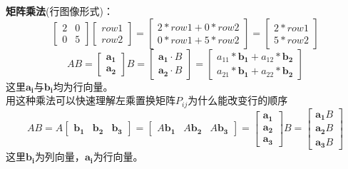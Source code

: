     \textbf{矩阵乘法}(行图像形式)：
    $$
    \begin{bmatrix}
        2 & 0 \\
        0 & 5
    \end{bmatrix}
    \begin{bmatrix}
        row1 \\
        row2
    \end{bmatrix}
    = 
    \begin{bmatrix}
        2*row1 + 0*row2 \\
        0*row1 + 5*row2
    \end{bmatrix}
    =
    \begin{bmatrix}
        2*row1 \\
        5*row2
    \end{bmatrix}
    $$
    $$
    AB =
    \begin{bmatrix}
       \bm{a_1} \\ \bm{a_2} 
    \end{bmatrix}
    B = 
    \begin{bmatrix}
        \bm{a_1} \cdot B \\ \bm{a_2} \cdot B
    \end{bmatrix}
    =
    \begin{bmatrix}
        a_{11} * \bm{b_1} + a_{12} * \bm{b_2} \\ a_{21} * \bm{b_1} + a_{22} * \bm{b_2}
    \end{bmatrix}
    $$
    这里$\bm{a_i}$与$\bm{b_i}$均为行向量。\\
    用这种乘法可以快速理解左乘置换矩阵$P_{ij}$为什么能改变行的顺序\\
    $$
    AB=A
    \begin{bmatrix}
        \bm{b_1} & \bm{b_2} & \bm{b_3}
    \end{bmatrix}
    =
    \begin{bmatrix}
        A\bm{b_1} & A\bm{b_2} & A\bm{b_3}
    \end{bmatrix}
    =
    \begin{bmatrix}
        \bm{a_1} \\ \bm{a_2} \\ \bm{a_3}
    \end{bmatrix}
    B=
    \begin{bmatrix}
        \bm{a_1}B \\ \bm{a_2}B \\ \bm{a_3}B
    \end{bmatrix}
    $$ 这里$\bm{b_i}$为列向量，$\bm{a_i}$为行向量。\\
